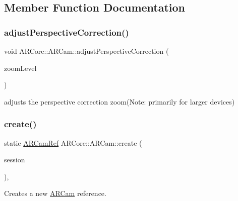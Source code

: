 \subsection{Member Function Documentation}
\mbox{\label{class_a_r_core_1_1_a_r_cam_ae2ecd3007e6684d1686c89d2ac3e7020}} 
\subsubsection{\texorpdfstring{adjust\+Perspective\+Correction()}{adjustPerspectiveCorrection()}}
{\footnotesize\ttfamily void A\+R\+Core\+::\+A\+R\+Cam\+::adjust\+Perspective\+Correction (\begin{DoxyParamCaption}\item[{float}]{zoom\+Level }\end{DoxyParamCaption})}



adjusts the perspective correction zoom(\+Note\+: primarily for larger devices) 

\mbox{\label{class_a_r_core_1_1_a_r_cam_ad4a6c0ebf786ea4e745cc8e95790681a}} 
\subsubsection{\texorpdfstring{create()}{create()}}
{\footnotesize\ttfamily static \hyperlink{namespace_a_r_core_a4ebe9e23907235fcf76bf65440fde0e0}{A\+R\+Cam\+Ref} A\+R\+Core\+::\+A\+R\+Cam\+::create (\begin{DoxyParamCaption}\item[{A\+R\+Session $\ast$}]{session }\end{DoxyParamCaption})\hspace{0.3cm}{\ttfamily [inline]}, {\ttfamily [static]}}



Creates a new \hyperlink{class_a_r_core_1_1_a_r_cam}{A\+R\+Cam} reference. 

\mbox{\label{class_a_r_core_1_1_a_r_cam_ac6506992ee88e0acd20d851849ebfa18}} 

